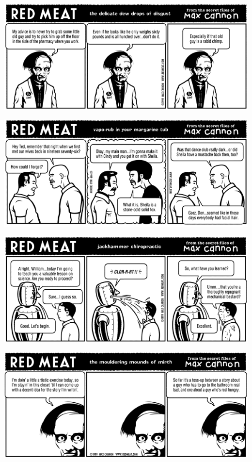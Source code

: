 \documentclass[a4paper,twoside,11pt]{article}
\begin{document}
\includegraphics[width=\textwidth]{redmeat_2000-01-17.png}



\includegraphics[width=\textwidth]{redmeat_2000-01-25.png}



\includegraphics[width=\textwidth]{redmeat_2000-02-01.png}



\includegraphics[width=\textwidth]{redmeat_2000-02-08.png}
\end{document}
